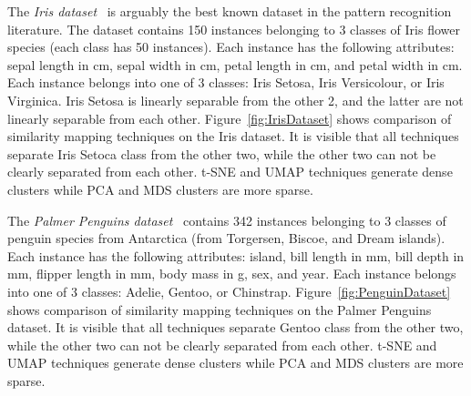 The \emph{Iris dataset}~\parencite{fisher1936use} is arguably the best
known dataset in the pattern recognition literature. The dataset contains
150 instances belonging to 3 classes of Iris flower species (each class
has 50 instances). Each instance has the following attributes: sepal
length in cm, sepal width in cm, petal length in cm, and petal width in
cm. Each instance belongs into one of 3 classes: Iris Setosa, Iris
Versicolour, or Iris Virginica. Iris Setosa is linearly separable from the
other 2, and the latter are not linearly separable from each other.
Figure~\ref{fig:IrisDataset} shows comparison of similarity mapping
techniques on the Iris dataset. It is visible that all techniques separate
Iris Setoca class from the other two, while the other two can not be
clearly separated from each other. t-SNE and UMAP techniques generate
dense clusters while PCA and MDS clusters are more sparse.

The \emph{Palmer Penguins dataset}~\parencite{gorman2014ecological,
horst2020penguins} contains 342 instances belonging to 3 classes of
penguin species from Antarctica (from Torgersen, Biscoe, and Dream
islands). Each instance has the following attributes: island, bill length
in mm, bill depth in mm, flipper length in mm, body mass in g, sex, and
year. Each instance belongs into one of 3 classes: Adelie, Gentoo, or
Chinstrap. Figure~\ref{fig:PenguinDataset} shows comparison of similarity
mapping techniques on the Palmer Penguins dataset. It is visible that all
techniques separate Gentoo class from the other two, while the other
two can not be clearly separated from each other. t-SNE and UMAP
techniques generate dense clusters while PCA and MDS clusters are more
sparse.

